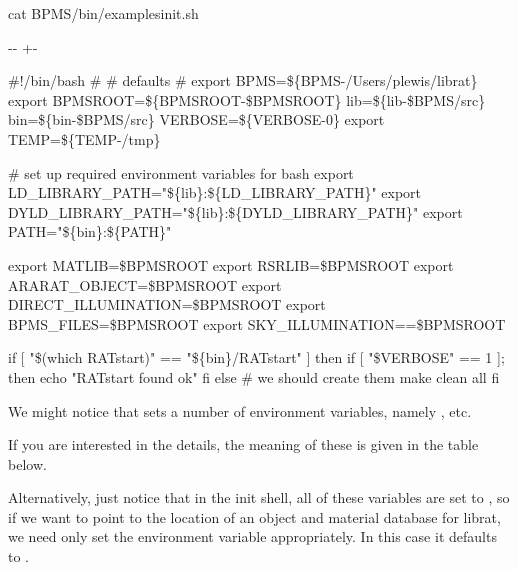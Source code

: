 \documentclass[letterpaper,10pt,english]{sphinxmanual}
\newlength\nbsphinxcodecellspacing
\begin{document}
{
\begin{sphinxVerbatim}[commandchars=\\\{\}]
\llap{\color{nbsphinxin}[8]:\,\hspace{\fboxrule}\hspace{\fboxsep}}cat \PYGZdl{}BPMS/bin/examples\PYGZus{}init.sh
\end{sphinxVerbatim}
}

{

\kern-\sphinxverbatimsmallskipamount\kern-\baselineskip
\kern+\FrameHeightAdjust\kern-\fboxrule
\vspace{\nbsphinxcodecellspacing}

\begin{sphinxVerbatim}[commandchars=\\\{\}]
\#!/bin/bash
\#
\# defaults
\#
export BPMS=\$\{BPMS-/Users/plewis/librat\}
export BPMSROOT=\$\{BPMSROOT-\$BPMSROOT\}
lib=\$\{lib-\$BPMS/src\}
bin=\$\{bin-\$BPMS/src\}
VERBOSE=\$\{VERBOSE-0\}
export TEMP=\$\{TEMP-/tmp\}

\# set up required environment variables for bash
export LD\_LIBRARY\_PATH="\$\{lib\}:\$\{LD\_LIBRARY\_PATH\}"
export DYLD\_LIBRARY\_PATH="\$\{lib\}:\$\{DYLD\_LIBRARY\_PATH\}"
export PATH="\$\{bin\}:\$\{PATH\}"

export MATLIB=\$BPMSROOT
export RSRLIB=\$BPMSROOT
export ARARAT\_OBJECT=\$BPMSROOT
export DIRECT\_ILLUMINATION=\$BPMSROOT
export BPMS\_FILES=\$BPMSROOT
export SKY\_ILLUMINATION==\$BPMSROOT

if [ "\$(which RATstart)" == "\$\{bin\}/RATstart" ]
then
  if [ "\$VERBOSE" == 1 ]; then
      echo "RATstart found ok"
  fi
else
  \# we should create them
  make clean all
fi
\end{sphinxVerbatim}
}

We might notice that  sets a number of environment variables, namely ,  etc.

If you are interested in the details, the meaning of these is given in the table below.

Alternatively, just notice that in the init shell, all of these variables are set to , so if we want to point to the location of an object and material database for librat, we need only set the environment variable  appropriately. In this case it defaults to .
\end{document}
